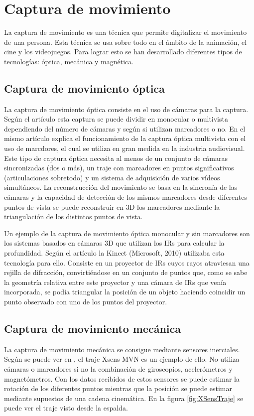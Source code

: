 \section{Captura de movimiento}

La captura de movimiento es una técnica que permite digitalizar el movimiento de una persona. Esta técnica se usa sobre todo en el ámbito de la animación, el cine y los videojuegos.
Para lograr esto se han desarrollado diferentes tipos de tecnologías: óptica, mecánica y magnética.

\subsection{Captura de movimiento óptica}
La captura de movimiento óptica consiste en el uso de cámaras para la captura.
Según el artículo \cite{OPTICAL} esta captura se puede dividir en monocular o multivista dependiendo del número de cámaras y según si utilizan marcadores o no.
En el mismo artículo explica el funcionamiento de la captura óptica multivista con el uso de marcdores, el cual se utiliza en gran medida en la industria audiovisual.
Este tipo de captura óptica necesita al menos de un conjunto de cámaras sincronizadas (dos o más), un traje con marcadores en puntos significativos (articulaciones sobretodo) y un sistema de adquisición de varios vídeos simultáneos.
La reconstrucción del movimiento se basa en la sincronía de las cámaras y la capacidad de detección de los mismos marcadores desde diferentes puntos de vista se puede reconstruir en 3D los marcadores mediante la triangulación de los distintos puntos de vista.

Un ejemplo de la captura de movimiento óptica monocular y sin marcadores son los sistemas basados en cámaras 3D que utilizan los \gls{IRs} para calcular la profundidad. Según el artículo \cite{KINECT} la Kinect (Microsoft, 2010) utilizaba esta tecnología para ello.
Consiste en un proyector de \gls{IRs} cuyos rayos atraviesan una rejilla de difracción, convirtiéndose en un conjunto de puntos que, como se sabe la geometría relativa entre este proyector y una cámara de \gls{IRs} que venía incorporada, se podía triangular la posición de un objeto haciendo coincidir un punto observado con uno de los puntos del proyector.

\subsection{Captura de movimiento mecánica}
La captura de movimiento mecánica se consigue mediante sensores inerciales.
Según se puede ver en \cite{XSENS}, el traje Xsens MVN es un ejemplo de ello.
No utiliza cámaras o marcadores si no la combinación de giroscopios, acelerómetros y magnetómetros.
Con los datos recibidos de estos sensores se puede estimar la rotación de los diferentes puntos mientras que la posición se puede estimar mediante supuestos de una cadena cinemática.
En la figura \ref{fig:XSensTraje} se puede ver el traje visto desde la espalda.

